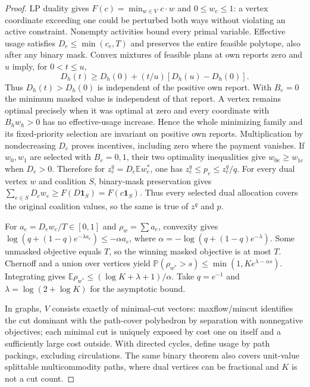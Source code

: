 \documentclass[11pt]{article}
\theoremstyle{definition}\newtheorem{definition}[theorem]{Definition}
\theoremstyle{remark}\newtheorem{remark}[theorem]{Remark}
\newcommand{\E}{\mathbb E}
\newcommand{\Prob}{\mathbb P}
\begin{document}
\begin{proof}
LP duality gives $F(c)=\min_{w\in V}c\cdot w$ and $0\le w_e\le1$:
a vertex coordinate exceeding one could be perturbed both ways without
violating an active constraint. Nonempty activities bound every primal
variable. Effective usage satisfies $D_e\le\min(c_e,T)$ and preserves
the entire feasible polytope, also after any binary mask. Convex mixtures
of feasible plans at own reports zero and $u$ imply, for $0<t\le u$,
\[
 D_h(t)\ge D_h(0)+(t/u)[D_h(u)-D_h(0)].
\]
Thus $D_h(t)>D_h(0)$ is independent of the positive own report. With $B_e=0$
the minimum masked value is independent of that report. A vertex remains
optimal precisely when it was optimal at zero and every coordinate with
$B_hw_h>0$ has no effective-usage increase. Hence the whole minimizing
family and its fixed-priority selection are invariant on positive own
reports. Multiplication by nondecreasing $D_e$ proves incentives, including
zero where the payment vanishes.
If $w_0,w_1$ are selected with $B_e=0,1$, their two optimality inequalities
give $w_{0e}\ge w_{1e}$ when $D_e>0$. Therefore for
$z_e^q=D_e\E w_e^*$, one has $z_e^q\le p_e\le z_e^q/q$.
For every dual vertex $w$ and coalition $S$, binary-mask preservation gives
$\sum_{e\in S}D_ew_e\ge F(D\mathbf1_S)=F(c\mathbf1_S)$.
Thus every selected dual allocation covers the original coalition values,
so the same is true of $z^q$ and $p$.

For $a_e=D_ew_e/T\in[0,1]$ and $\rho_w=\sum a_e$, convexity gives
$\log(q+(1-q)e^{-\lambda a_e})\le-\alpha a_e$, where
$\alpha=-\log(q+(1-q)e^{-\lambda})$. Some unmasked objective equals $T$,
so the winning masked objective is at most $T$. Chernoff and a union over
vertices yield $\Prob(\rho_{w^*}>s)\le\min(1,Ke^{\lambda-\alpha s})$.
Integrating gives $\E\rho_{w^*}\le(\log K+\lambda+1)/\alpha$.
Take $q=e^{-1}$ and $\lambda=\log(2+\log K)$ for the asymptotic bound.

In graphs, $V$ consists exactly of minimal-cut vectors: maxflow/mincut
identifies the cut dominant with the path-cover polyhedron by separation
with nonnegative objectives; each minimal cut is uniquely exposed by
cost one on itself and a sufficiently large cost outside. With directed
cycles, define usage by path packings, excluding circulations. The same
binary theorem also covers unit-value splittable multicommodity paths,
where dual vertices can be fractional and $K$ is not a cut count.


\end{proof}
\end{document}
